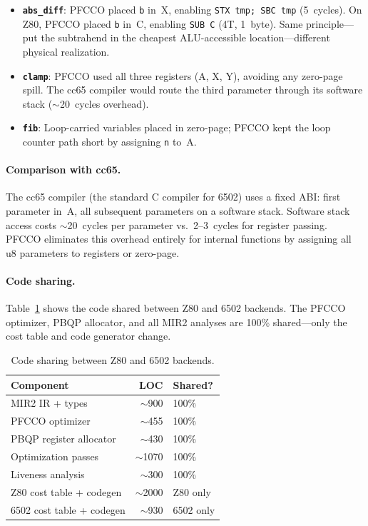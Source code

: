 \documentclass[sigplan,screen,nonacm]{acmart}
\begin{document}
\begin{itemize}
\item \textbf{\texttt{abs\_diff}}: PFCCO placed \texttt{b} in~X, enabling
  \texttt{STX~tmp; SBC~tmp} (5~cycles).  On Z80, PFCCO placed \texttt{b} in~C,
  enabling \texttt{SUB~C} (4T, 1~byte).  Same principle---put the subtrahend in
  the cheapest ALU-accessible location---different physical realization.
\item \textbf{\texttt{clamp}}: PFCCO used all three registers (A, X, Y),
  avoiding any zero-page spill.  The cc65 compiler would route the third
  parameter through its software stack ($\sim$20~cycles overhead).
\item \textbf{\texttt{fib}}: Loop-carried variables placed in zero-page;
  PFCCO kept the loop counter path short by assigning \texttt{n} to~A.
\end{itemize}

\paragraph{Comparison with cc65.}
The cc65 compiler (the standard C compiler for 6502) uses a fixed ABI: first
parameter in~A, all subsequent parameters on a software stack.  Software stack
access costs $\sim$20~cycles per parameter vs.\ 2--3~cycles for register
passing.  PFCCO eliminates this overhead entirely for internal functions by
assigning all u8 parameters to registers or zero-page.

\paragraph{Code sharing.}
Table~\ref{tab:6502sharing} shows the code shared between Z80 and 6502
backends.  The PFCCO optimizer, PBQP allocator, and all MIR2 analyses are
100\% shared---only the cost table and code generator change.

\begin{table}[h]
\centering\small
\caption{Code sharing between Z80 and 6502 backends.}
\label{tab:6502sharing}
\begin{tabular}{@{}lrl@{}}
\toprule
Component & LOC & Shared? \\
\midrule
MIR2 IR + types         & $\sim$900  & 100\% \\
PFCCO optimizer         & $\sim$455  & 100\% \\
PBQP register allocator & $\sim$430  & 100\% \\
Optimization passes     & $\sim$1070 & 100\% \\
Liveness analysis       & $\sim$300  & 100\% \\
\midrule
Z80 cost table + codegen  & $\sim$2000 & Z80 only \\
6502 cost table + codegen & $\sim$930  & 6502 only \\
\bottomrule
\end{tabular}
\end{table}
\end{document}
